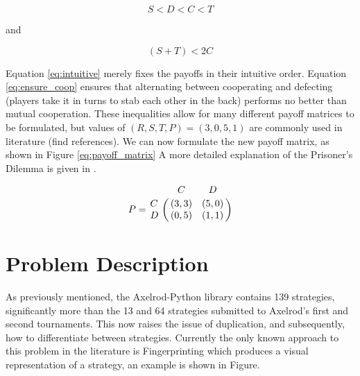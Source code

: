 \begin{equation}\label{eq:intuitive}
S < D < C < T
\end{equation}

and

\begin{equation}\label{eq:ensure_coop}
(S + T) < 2 C
\end{equation}

Equation \ref{eq:intuitive} merely fixes the payoffs in their intuitive order.
Equation \ref{eq:ensure_coop} ensures that alternating between cooperating and defecting (players take it in turns to stab each other in the back) performs no better than mutual cooperation.
These inequalities allow for many different payoff matrices to be formulated, but values of $(R, S, T, P) = (3, 0, 5, 1)$ are commonly used in literature (find references). %
We can now formulate the new payoff matrix, as shown in Figure \ref{eq:payoff_matrix}
A more detailed explanation of the Prisoner's Dilemma is given in \cite{Gotts2003}.

\begin{equation}\label{eq:payoff_matrix}
%
P = \bordermatrix{~ & C & D \cr
                  C & (3, 3) & (5, 0) \cr
                  D & (0, 5) & (1, 1) \cr}
%
\end{equation}

\section{Problem Description}

As previously mentioned, the Axelrod-Python library contains 139 strategies,
significantly more than the 13 and 64 strategies submitted to Axelrod's first
and second tournaments.  %
This now raises the issue of duplication, and subsequently, how to differentiate between strategies.
Currently the only known approach to this problem in the literature is Fingerprinting which produces a visual representation of a strategy, an example is shown in Figure. %

